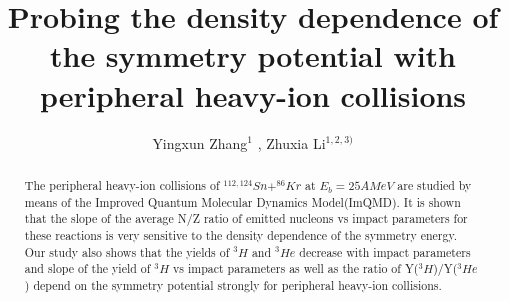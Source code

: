 \documentclass[aps,prc,groupedaddress,showpacs,manuscript]{revtex4}
\begin{document}
\title {Probing the density dependence of the
symmetry potential with peripheral heavy-ion collisions}
\author {Yingxun Zhang$^{1}$
, Zhuxia Li$^{1,2,3)}$
}
\address{
 1) China Institute of Atomic Energy, P. O. Box 275 (18),
Beijing 102413, P. R. China\\
2) Center of Theoretical Nuclear Physics, National Laboratory of
Lanzhou Heavy Ion Accelerator,
 Lanzhou 730000, P. R. China\\
 3) Institute of Theoretical Physics, Chinese Academic of Science,
Beijing 100080}
\begin{abstract}
The peripheral heavy-ion collisions of $^{112, 124}Sn+ ^{86}Kr$ at
$E_{b}= 25AMeV$ are studied by means of the Improved Quantum
Molecular Dynamics Model(ImQMD). It is shown that the slope of the
average N/Z ratio of emitted nucleons vs impact parameters for
these reactions is very sensitive to the density dependence of the
symmetry energy. Our study also shows that the yields of $^{3}H$
and $^{3}He$ decrease with impact parameters and slope of the
yield of $^{3}H$ vs impact parameters as well as the ratio of
Y($^{3}H$)/Y($^{3}He$) depend on the symmetry potential strongly
for peripheral heavy-ion collisions.\\
\end{abstract}
 \maketitle
\end{document}
